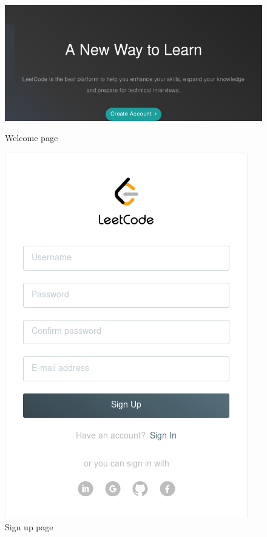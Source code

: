 \documentclass[12pt, letterpaper]{article}
\begin{document}
\begin{figure}
    \includegraphics[width=\linewidth]{img/L1.png}
    \caption{Welcome page}
    \label{fig:L1}
    \includegraphics[width=\linewidth]{img/L2.png}
    \caption{Sign up page}
    \label{fig:L1}
\end{figure}
\end{document}

